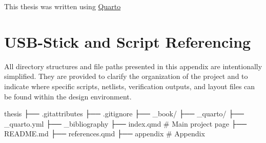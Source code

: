 \documentclass[
  11pt,
  a4paper,
  twoside]{scrbook}
\newenvironment{Shaded}{}{}
\newcommand{\NormalTok}[1]{#1}
\begin{document}
This thesis was written using \href{https://quarto.org/}{Quarto}

\chapter{USB-Stick and Script
Referencing}\label{usb-stick-and-script-referencing}

All directory structures and file paths presented in this appendix are
intentionally simplified. They are provided to clarify the organization
of the project and to indicate where specific scripts, netlists,
verification outputs, and layout files can be found within the design
environment.

\begin{Shaded}
\begin{Highlighting}[]
\NormalTok{thesis}
\NormalTok{├── .gitattributes}
\NormalTok{├── .gitignore}
\NormalTok{├── \_book/}
\NormalTok{├── \_quarto/}
\NormalTok{├── \_quarto.yml}
\NormalTok{├── \_bibliography}
\NormalTok{├── index.qmd            \# Main project page}
\NormalTok{├── README.md}
\NormalTok{├── references.qmd}
\NormalTok{├── appendix             \# Appendix}
\end{Highlighting}
\end{Shaded}



\backmatter
\end{document}
